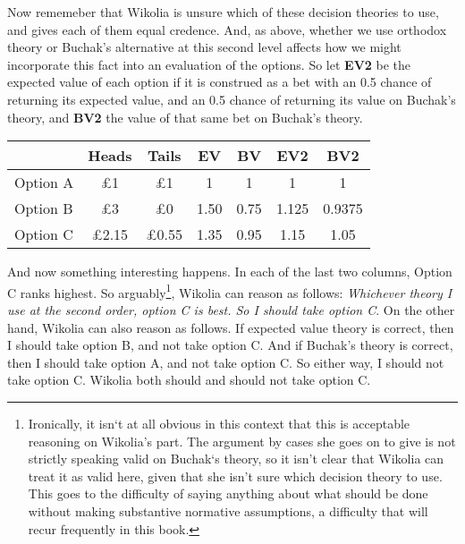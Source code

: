 Now rememeber that \gls{Wikolia} is unsure which of these decision theories to use, and gives each of them equal credence. And, as above, whether we use orthodox theory or Buchak's alternative at this second level affects how we might incorporate this fact into an evaluation of the options. So let \textbf{EV2} be the expected value of each option if it is construed as a bet with an 0.5 chance of returning its expected value, and an 0.5 chance of returning its value on Buchak's theory, and \textbf{BV2} the value of that same bet on Buchak's theory.

\begin{table}[htbp]
\begin{minipage}{\linewidth}
\setlength{\tymax}{0.5\linewidth}
\centering
\small
\begin{tabulary}{\textwidth}{@{}lcccccc@{}} \toprule
 & Heads & Tails & EV & BV & EV2 & BV2 \\
\midrule

 Option A & £1 & £1 & 1 & 1 & 1 & 1 \\
 Option B & £3 & £0 & 1.50 & 0.75 & 1.125 & 0.9375\\
 Option C & £2.15 & £0.55 & 1.35 & 0.95 & 1.15 & 1.05 \\
\bottomrule

\end{tabulary}
\end{minipage}
\end{table}

And now something interesting happens. In each of the last two columns, Option C ranks highest. So arguably\footnote{Ironically, it isn`t at all obvious in this context that this is acceptable reasoning on Wikolia's part. The argument by cases she goes on to give is not strictly speaking valid on Buchak`s theory, so it isn't clear that Wikolia can treat it as valid here, given that she isn't sure which decision theory to use. This goes to the difficulty of saying anything about what should be done without making substantive normative assumptions, a difficulty that will recur frequently in this book.}, \gls{Wikolia} can reason as follows: \emph{Whichever theory I use at the second order, option C is best. So I should take option C}. On the other hand, \gls{Wikolia} can also reason as follows. If expected value theory is correct, then I should take option B, and not take option C. And if Buchak's theory is correct, then I should take option A, and not take option C. So either way, I should not take option C. \gls{Wikolia} both should and should not take option C.

